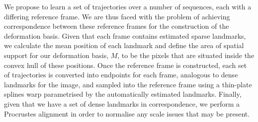 We propose to learn a set of trajectories over a number of sequences, each with
a differing reference frame. We are thus faced with the problem
of achieving correspondence between these reference frames for the construction
of the deformation basis. Given that each frame contains estimated sparse landmarks,
we calculate the mean position of each landmark and define the area of spatial support
for our deformation basis, $M$, to be the pixels that are situated inside the
convex hull of these positions. Once the reference frame is constructed,
each set of trajectories is converted into endpoints for each frame, analogous
to dense landmarks for the image, and sampled into the reference frame using
a thin-plate splines warp parametrised by the automatically estimated landmarks.
Finally, given that we have a set of dense landmarks in correspondence, we perform a 
Procrustes alignment in order to normalise any scale issues that may be present.
